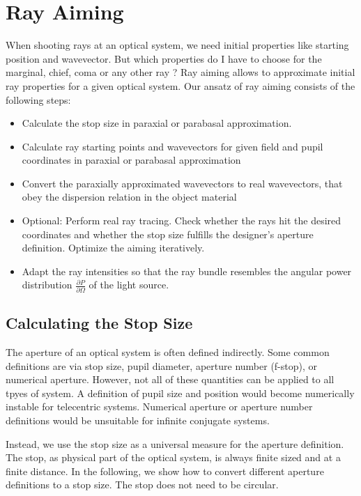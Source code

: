 \documentclass[12pt,a4paper,twoside,openright,BCOR10mm,headsepline,titlepage,abstracton,chapterprefix,final]{scrreprt}
\begin{document}
\section{Ray Aiming}
When shooting rays at an optical system, we need initial properties like starting position and wavevector.
But which properties do I have to choose for the marginal, chief, coma or any other ray ?
Ray aiming allows to approximate initial ray properties for a given optical system.
Our ansatz of ray aiming consists of the following steps:
\begin{itemize}
 \item Calculate the stop size in paraxial or parabasal approximation.
 \item Calculate ray starting points and wavevectors for given field and pupil coordinates in paraxial or parabasal approximation
 \item Convert the paraxially approximated wavevectors to real wavevectors,
       that obey the dispersion relation in the object material
 \item Optional: Perform real ray tracing. Check whether the rays hit the desired coordinates 
       and whether the stop size fulfills the designer's aperture definition.
       Optimize the aiming iteratively.
 \item Adapt the ray intensities so that the ray bundle resembles the angular power distribution $\frac{\partial P}{\partial \Omega}$ of the light source.
\end{itemize}

\subsection{Calculating the Stop Size}
The aperture of an optical system is often defined indirectly.
Some common definitions are via stop size, pupil diameter, aperture number (f-stop), or numerical aperture.
However, not all of these quantities can be applied to all tpyes of system.
A definition of pupil size and position would become numerically instable for telecentric systems.
Numerical aperture or aperture number definitions would be unsuitable for infinite conjugate systems.

Instead, we use the stop size as a universal measure for the aperture definition.
The stop, as physical part of the optical system, is always finite sized and at a finite distance.
In the following, we show how to convert different aperture definitions to a stop size.
The stop does not need to be circular. 
\end{document}
